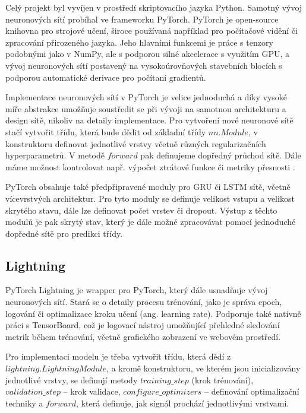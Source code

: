 Celý projekt byl vyvíjen v prostředí skriptovacího jazyka Python. Samotný vývoj
neuronových sítí probíhal ve frameworku PyTorch. PyTorch je open-source
knihovna pro strojové učení, široce používaná například pro počítačové vidění
či zpracování přirozeného jazyka. Jeho hlavními funkcemi je práce s tenzory
podobnými jako v NumPy, ale s podporou silné akcelerace s využitím GPU, a vývoj
neuronových sítí postavený na vysokoúrovňových stavebních blocích s podporou
automatické derivace pro počítaní gradientů.

Implementace neuronových sítí v PyTorch je velice jednoduchá a díky vysoké míře
abstrakce umožňuje soustředit se při vývoji na samotnou architekturu a design
sítě, nikoliv na detaily implementace. Pro vytvoření nové neuronové sítě stačí
vytvořit třídu, která bude dědit od základní třídy $nn.Module$, v konstruktoru
definovat jednotlivé vrstvy včetně různých regularizačních hyperparametrů. V
metodě $forward$ pak definujeme dopředný průchod sítě. Dále máme možnost
kontrolovat např. výpočet ztrátové funkce či metriky přesnosti \cite{pytorchdocs}.

PyTorch obsahuje také předpřipravené moduly pro GRU či LSTM sítě, včetně
vícevrstvých architektur. Pro tyto moduly se definuje velikost vstupu a
velikost skrytého stavu, dále lze definovat počet vrstev či dropout. Výstup z
těchto modulů je pak skrytý stav, který je dále možné zpracovávat pomocí
jednoduché dopředné sítě pro predikci třídy.

\subsection{Lightning}
\label{sec:Lightning}

PyTorch Lightning je wrapper pro PyTorch, který dále usnadňuje vývoj
neuronových sítí. Stará se o detaily procesu trénování, jako je správa epoch,
logování či optimalizace kroku učení (ang. learning rate). Podporuje také
nativně práci s TensorBoard, což je logovací nástroj umožňující přehledné
sledování metrik během trénování, včetně grafického zobrazení ve webovém
prostředí.

Pro implementaci modelu je třeba vytvořit třídu, která dědí z
$lightning.LightningModule$, a kromě konstruktoru, ve kterém jsou
inicializovány jednotlivé vrstvy, se definují metody $training\_step$ (krok
trénování), $validation\_step$ – krok validace, $configure\_optimizers$ –
definování optimalizační techniky a $forward$, která definuje, jak signál
prochází jednotlivými vrstvami.

